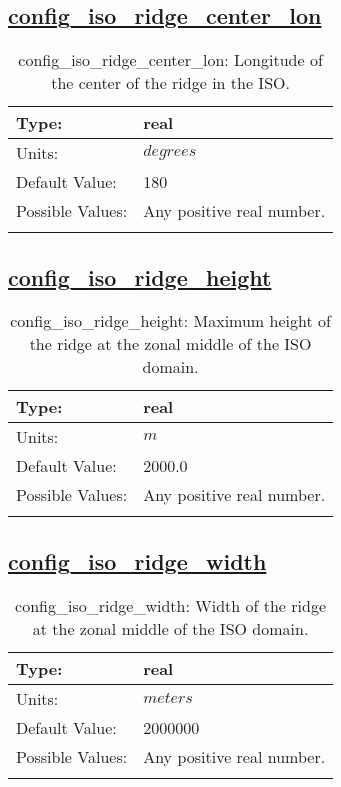 \subsection[config\_iso\_ridge\_center\_lon]{\hyperref[sec:nm_tab_iso]{config\_iso\_ridge\_center\_lon}}
\label{subsec:nm_sec_config_iso_ridge_center_lon}
\begin{center}
\begin{longtable}{| p{2.0in} || p{4.0in} |}
    \hline
    Type: & real \\
    \hline
    Units: & $degrees$ \\
    \hline
    Default Value: & 180 \\
    \hline
    Possible Values: & Any positive real number. \\
    \hline
    \caption{config\_iso\_ridge\_center\_lon: Longitude of the center of the ridge in the ISO.}
\end{longtable}
\end{center}
\subsection[config\_iso\_ridge\_height]{\hyperref[sec:nm_tab_iso]{config\_iso\_ridge\_height}}
\label{subsec:nm_sec_config_iso_ridge_height}
\begin{center}
\begin{longtable}{| p{2.0in} || p{4.0in} |}
    \hline
    Type: & real \\
    \hline
    Units: & $m$ \\
    \hline
    Default Value: & 2000.0 \\
    \hline
    Possible Values: & Any positive real number. \\
    \hline
    \caption{config\_iso\_ridge\_height: Maximum height of the ridge at the zonal middle of the ISO domain.}
\end{longtable}
\end{center}
\subsection[config\_iso\_ridge\_width]{\hyperref[sec:nm_tab_iso]{config\_iso\_ridge\_width}}
\label{subsec:nm_sec_config_iso_ridge_width}
\begin{center}
\begin{longtable}{| p{2.0in} || p{4.0in} |}
    \hline
    Type: & real \\
    \hline
    Units: & $meters$ \\
    \hline
    Default Value: & 2000000 \\
    \hline
    Possible Values: & Any positive real number. \\
    \hline
    \caption{config\_iso\_ridge\_width: Width of the ridge at the zonal middle of the ISO domain.}
\end{longtable}
\end{center}
